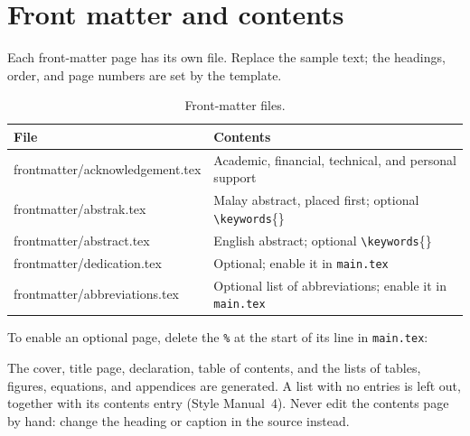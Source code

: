 \documentclass[11pt,a4paper]{article}
\newcommand\cmd[1]{\texttt{\textbackslash #1}}
\newcommand\file[1]{\texttt{#1}}
\newcommand\thd[1]{\bfseries #1}
\begin{document}
\clearpage
\section{Front matter and contents}\label{sec:front}

Each front-matter page has its own file. Replace the sample text; the headings,
order, and page numbers are set by the template.

\begin{table}[htbp]
\caption{Front-matter files.}
\label{tab:front}
\small
\begin{tabularx}{\textwidth}{@{}>{\ttfamily}p{60mm}X@{}}
\toprule
\normalfont\thd{File} & \thd{Contents} \\
\midrule
frontmatter/acknowledgement.tex & Academic, financial, technical, and personal support \\
frontmatter/abstrak.tex         & Malay abstract, placed first; optional \cmd{keywords}\{\} \\
frontmatter/abstract.tex        & English abstract; optional \cmd{keywords}\{\} \\
frontmatter/dedication.tex      & Optional; enable it in \file{main.tex} \\
frontmatter/abbreviations.tex   & Optional list of abbreviations; enable it in \file{main.tex} \\
\bottomrule
\end{tabularx}
\end{table}

To enable an optional page, delete the \texttt{\%} at the start of its line in
\file{main.tex}:
\begin{code}
\end{code}

The cover, title page, declaration, table of contents, and the lists of tables,
figures, equations, and appendices are generated. A list with no entries is
left out, together with its contents entry (Style Manual~4). Never edit the
contents page by hand: change the heading or caption in the source instead.
\end{document}
